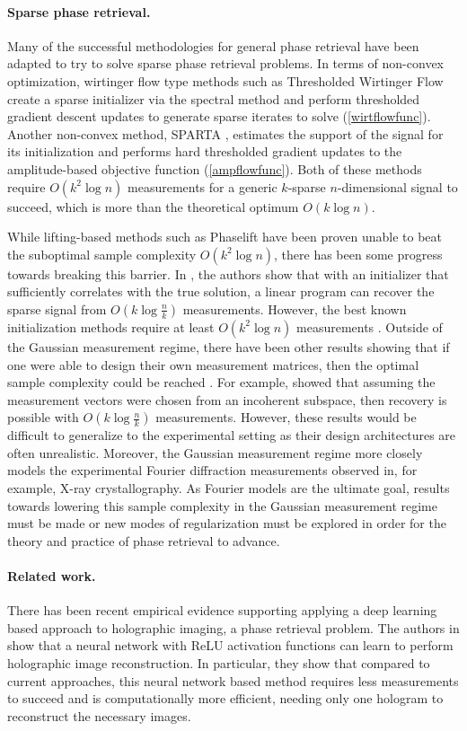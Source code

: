 \documentclass{article}
\begin{document}
\paragraph{Sparse phase retrieval.} Many of the successful methodologies for general phase retrieval have been adapted to try to solve sparse phase retrieval problems. In terms of non-convex optimization, wirtinger flow type methods such as Thresholded Wirtinger Flow \cite{Cai2016} create a sparse initializer via the spectral method and perform thresholded gradient descent updates to generate sparse iterates to solve (\ref{wirtflowfunc}). Another non-convex method, SPARTA \cite{SPARTA}, estimates the support of the signal for its initialization and performs hard thresholded gradient updates to the amplitude-based objective function (\ref{ampflowfunc}). Both of these methods require $O(k^2 \log n)$ measurements for a generic $k$-sparse $n$-dimensional signal to succeed, which is more than the theoretical optimum $O(k \log n)$.

While lifting-based methods such as Phaselift have been proven unable to beat the suboptimal sample complexity $O(k^2 \log n)$, there has been some progress towards breaking this barrier. In \cite{HV2016}, the authors show that with an initializer that sufficiently correlates with the true solution, a linear program can recover the sparse signal from $O(k \log \frac{n}{k})$ measurements. However, the best known initialization methods require at least $O(k^2 \log n)$ measurements \cite{Cai2016}. Outside of the Gaussian measurement regime, there have been other results showing that if one were able to design their own measurement matrices, then the optimal sample complexity could be reached \cite{SparsePRoverview}. For example, \cite{Romberg2015} showed that assuming the measurement vectors were chosen from an incoherent subspace, then recovery is possible with $O(k \log \frac{n}{k})$ measurements. However, these results would be difficult to generalize to the experimental setting as their design architectures are often unrealistic. Moreover, the Gaussian measurement regime more closely models the experimental Fourier diffraction measurements observed in, for example, X-ray crystallography. As Fourier models are the ultimate goal, results towards lowering this sample complexity in the Gaussian measurement regime must be made or new modes of regularization must be explored in order for the theory and practice of phase retrieval to advance.

\paragraph{Related work.} There has been recent empirical evidence supporting applying a deep learning based approach to holographic imaging, a phase retrieval problem. The authors in \cite{Rivenson2017} show that a neural network with ReLU activation functions can learn to perform holographic image reconstruction. In particular, they show that compared to current approaches, this neural network based method requires less measurements to succeed and is computationally more efficient, needing only one hologram to reconstruct the necessary images. 
\end{document}
